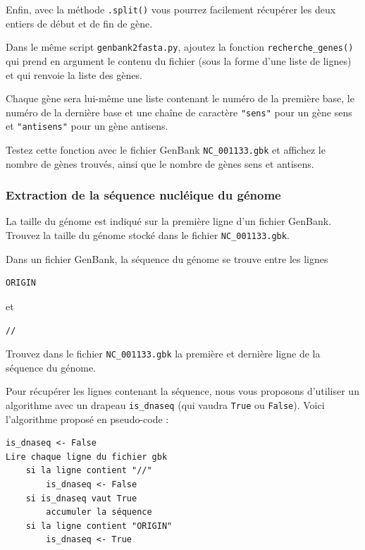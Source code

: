 \documentclass[a4paper,11pt,twoside]{book}
\begin{document}
Enfin, avec la méthode \texttt{.split()} vous pourrez facilement
récupérer les deux entiers de début et de fin de gène.

Dans le même script \texttt{genbank2fasta.py}, ajoutez la fonction
\texttt{recherche\_genes()} qui prend en argument le contenu du fichier
(sous la forme d'une liste de lignes) et qui renvoie la liste des gènes.

Chaque gène sera lui-même une liste contenant le numéro de la première
base, le numéro de la dernière base et une chaîne de caractère
\texttt{"sens"} pour un gène sens et \texttt{"antisens"} pour un gène
antisens.

Testez cette fonction avec le fichier GenBank \texttt{NC\_001133.gbk} et
affichez le nombre de gènes trouvés, ainsi que le nombre de gènes sens
et antisens.

\subsubsection{Extraction de la séquence nucléique du
génome}\label{extraction-de-la-suxe9quence-nucluxe9ique-du-guxe9nome}

La taille du génome est indiqué sur la première ligne d'un fichier
GenBank. Trouvez la taille du génome stocké dans le fichier
\texttt{NC\_001133.gbk}.

Dans un fichier GenBank, la séquence du génome se trouve entre les
lignes

\begin{verbatim}
ORIGIN  
\end{verbatim}

et

\begin{verbatim}
//
\end{verbatim}

Trouvez dans le fichier \texttt{NC\_001133.gbk} la première et dernière
ligne de la séquence du génome.

Pour récupérer les lignes contenant la séquence, nous vous proposons
d'utiliser un algorithme avec un drapeau \texttt{is\_dnaseq} (qui vaudra
\texttt{True} ou \texttt{False}). Voici l'algorithme proposé en
pseudo-code :

\begin{verbatim}
is_dnaseq <- False
Lire chaque ligne du fichier gbk
    si la ligne contient "//"
        is_dnaseq <- False
    si is_dnaseq vaut True
        accumuler la séquence
    si la ligne contient "ORIGIN"
        is_dnaseq <- True
\end{verbatim}
\end{document}
